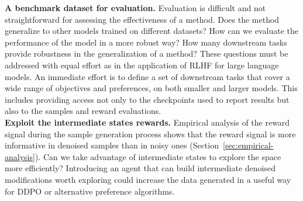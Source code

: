 \noindent \textbf{A benchmark dataset for evaluation.} Evaluation is difficult and not straightforward for assessing the effectiveness of a method. Does the method generalize to other models trained on different datasets? How can we evaluate the performance of the model in a more robust way? How many downstream tasks provide robustness in the generalization of a method? These questions must be addressed with equal effort as in the application of RLHF for large language models. An immediate effort is to define a set of downstream tasks that cover a wide range of objectives and preferences, on both smaller and larger models. This includes providing access not only to the checkpoints used to report results but also to the samples and reward evaluations. \\

\noindent \textbf{Exploit the intermediate states rewards.} Empirical analysis of the reward signal during the sample generation process shows that the reward signal is more informative in denoised samples than in noisy ones (Section~\ref{sec:empirical-analysis}). Can we take advantage of intermediate states to explore the space more efficiently? Introducing an agent that can build intermediate denoised modifications worth exploring could increase the data generated in a useful way for DDPO or alternative preference algorithms. \\
